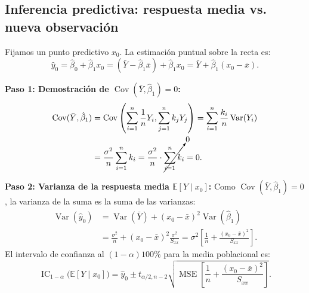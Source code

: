 \documentclass[11pt,a4paper]{article}
\begin{document}
\subsection{Inferencia predictiva: respuesta media vs. nueva observación}

Fijamos un punto predictivo $x_0$. La estimación puntual sobre la recta es:
\begin{equation}
\hat{y}_0 = \hat{\beta}_0 + \hat{\beta}_1 x_0 = (\bar{Y} - \hat{\beta}_1 \bar{x}) + \hat{\beta}_1 x_0 = \bar{Y} + \hat{\beta}_1(x_0 - \bar{x}).
\end{equation}

\begin{demobox}
\textbf{Paso 1: Demostración de $\operatorname{Cov}(\bar{Y}, \hat{\beta}_1) = 0$:}
\begin{align}
\operatorname{Cov}(\bar{Y}, \hat{\beta}_1) &= \operatorname{Cov}\left( \sum_{i=1}^n \frac{1}{n} Y_i, \sum_{j=1}^n k_j Y_j \right) = \sum_{i=1}^n \frac{k_i}{n} \operatorname{Var}(Y_i) \\
&= \frac{\sigma^2}{n}\sum_{i=1}^n k_i = \frac{\sigma^2}{n} \cdot \cancelto{0}{\sum_{i=1}^n k_i} = 0.
\end{align}

\textbf{Paso 2: Varianza de la respuesta media $\mathbb{E}[Y \mid x_0]$:}  
Como $\operatorname{Cov}(\bar{Y}, \hat{\beta}_1) = 0$, la varianza de la suma es la suma de las varianzas:
\begin{align}
\operatorname{Var}(\hat{y}_0) &= \operatorname{Var}(\bar{Y}) + (x_0 - \bar{x})^2 \operatorname{Var}(\hat{\beta}_1) \\
&= \frac{\sigma^2}{n} + (x_0 - \bar{x})^2 \frac{\sigma^2}{S_{xx}} = \sigma^2 \left[ \frac{1}{n} + \frac{(x_0 - \bar{x})^2}{S_{xx}} \right].
\end{align}
El intervalo de confianza al $(1-\alpha)100\%$ para la media poblacional es:
\begin{equation}
\operatorname{IC}_{1-\alpha}\big(\mathbb{E}[Y \mid x_0]\big) = \hat{y}_0 \pm t_{\alpha/2, n-2} \sqrt{\operatorname{MSE}\left[\frac{1}{n} + \frac{(x_0 - \bar{x})^2}{S_{xx}}\right]}.
\end{equation}


\end{demobox}
\end{document}

